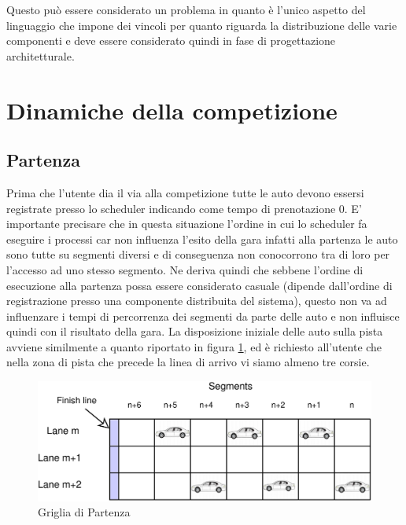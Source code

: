 \documentclass[11pt,a4paper]{report}
\begin{document}
Questo può essere considerato un problema in quanto è l'unico aspetto del linguaggio che impone dei vincoli per quanto riguarda la distribuzione delle varie componenti e deve essere considerato quindi in fase di progettazione architetturale.
\section{Dinamiche della competizione}
\subsection{Partenza}
Prima che l'utente dia il via alla competizione tutte le auto devono essersi registrate presso lo scheduler indicando come tempo di prenotazione 0.
E' importante precisare che in questa situazione l'ordine in cui lo scheduler fa eseguire i processi car non influenza l'esito della gara infatti alla partenza le auto sono tutte su segmenti diversi e di conseguenza non conocorrono tra di loro per l'accesso ad uno stesso segmento. Ne deriva quindi che sebbene l'ordine di esecuzione alla partenza possa essere considerato casuale (dipende dall'ordine di registrazione presso una componente distribuita del sistema), questo non va ad influenzare i tempi di percorrenza dei segmenti da parte delle auto e non influisce quindi con il risultato della gara.
La disposizione iniziale delle auto sulla pista avviene similmente a quanto riportato in figura \ref{fig:startGrid}, ed è richiesto all'utente che nella zona di pista che precede la linea di arrivo vi siamo almeno tre corsie.
\begin{figure}
\includegraphics[width=\textwidth]{diagrammi/StartGrid}
\caption{Griglia di Partenza}
\label{fig:startGrid}
\end{figure}
\end{document}
